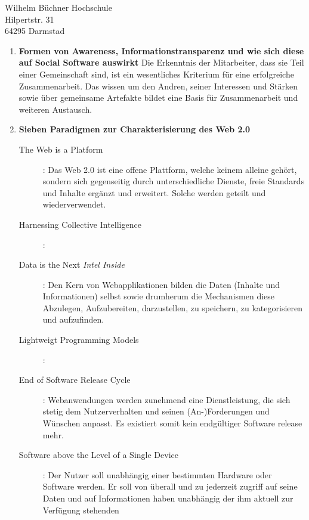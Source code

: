 \documentclass[
    version=last,           %
    DIV=13,                 %
    BCOR=0mm,               %
    paper=a4,               %
    fontsize=12pt,          %
    firsthead=on,           %
    firstfoot=on,           %
    pagenumber=on,i         %
    parskip=half,           %
    enlargefirstpage=,      %
    firsthead=on,           %
    fromrule=afteraddress,  %
    priority=off,           %
    backaddress=true,       %
    refline=dateright,      %
	fromalign=right,	    %
    fromemail=on,i          %
    fromurl=on,             %
    frombank=on,
    fromphone=on,           %
    frommobilephone=on      %
    fromlogo=on,            %
    addrfield=on,           %
    subject=untitled,  %
    foldmarks=off,          %
    numericaldate=off,      %
	pagenumber=right,	        %
	parskip=half,	        %
    headsep=false,          %
    footsepline=true,       %
    foldmarks=off,		    %
	]{scrlttr2}
\begin{document}
\begin{letter} {Wilhelm Büchner Hochschule \\
Hilpertstr. 31\\
64295 Darmstad}
\begin{itemize}
\begin{enumerate}
            \vspace{1cm}

        \item \textbf{Formen von Awareness, Informationstransparenz und wie sich
            diese auf Social Software auswirkt}
            Die Erkenntnis der Mitarbeiter, dass sie Teil einer Gemeinschaft
            sind, ist ein wesentliches Kriterium für eine erfolgreiche
            Zusammenarbeit. Das wissen um den Andren, seiner Interessen und
            Stärken sowie über gemeinsame Artefakte bildet eine Basis für
            Zusammenarbeit und weiteren Austausch.


            \vspace{1cm}
        \item \textbf{Sieben Paradigmen zur Charakterisierung des Web 2.0}
            \begin{description}
                \item[The Web is a Platform]:
                    Das Web 2.0 ist eine offene Plattform, welche keinem alleine
                    gehört, sondern sich gegenseitig durch unterschiedliche
                    Dienste, freie Standards und Inhalte ergänzt und erweitert.
                    Solche werden geteilt und wiederverwendet.
                \item[Harnessing Collective Intelligence]:
                \item[Data is the Next \textit{Intel Inside} ]:
                    Den Kern von Webapplikationen bilden die Daten (Inhalte und
                    Informationen) selbst sowie drumherum die Mechanismen diese
                    Abzulegen, Aufzubereiten, darzustellen, zu speichern, zu
                    kategorisieren und aufzufinden.
                \item[Lightweigt Programming Models]:
                \item[End of Software Release Cycle]:
                    Webanwendungen werden zunehmend eine Dienstleistung, die
                    sich stetig dem Nutzerverhalten und seinen (An-)Forderungen
                    und Wünschen anpasst. Es existiert somit kein endgültiger
                    Software release mehr.
                \item[Software above the Level of a Single Device]:
                    Der Nutzer soll unabhängig einer bestimmten Hardware oder
                    Software werden. Er soll von überall und zu jederzeit
                    zugriff auf seine Daten und auf Informationen haben
                    unabhängig der ihm aktuell zur Verfügung stehenden

\end{description}
\end{enumerate}
\end{itemize}
\end{letter}
\end{document}
